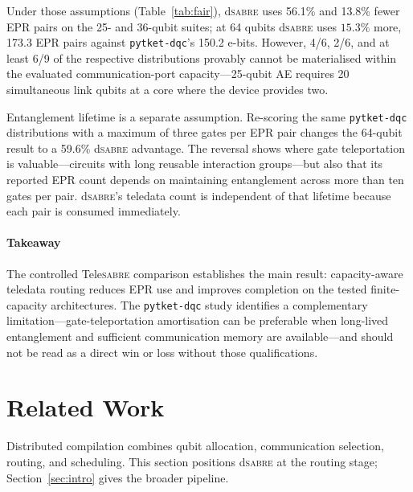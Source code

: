 \documentclass[journal]{IEEEtran}
\newcommand{\dSABRE}{d\textsc{sabre}}
\newcommand{\TeleSABRE}{Tele\textsc{sabre}}
\begin{document}
\label{sec:pytket_results}Under those assumptions (Table~\ref{tab:fair}), \dSABRE{} uses 56.1\% and 13.8\% fewer EPR pairs on the 25- and 36-qubit suites; at 64 qubits \dSABRE{} uses $15.3\%$ more, 173.3 EPR pairs against \texttt{pytket-dqc}'s 150.2 e-bits.  However, 4/6, 2/6, and at least 6/9 of the respective distributions provably cannot be materialised within the evaluated communication-port capacity---25-qubit AE requires 20 simultaneous link qubits at a core where the device provides two.

\label{sec:lifetime}Entanglement lifetime is a separate assumption.  Re-scoring the same \texttt{pytket-dqc} distributions with a maximum of three gates per EPR pair changes the 64-qubit result to a 59.6\% \dSABRE{} advantage.  The reversal shows where gate teleportation is valuable---circuits with long reusable interaction groups---but also that its reported EPR count depends on maintaining entanglement across more than ten gates per pair.  \dSABRE{}'s teledata count is independent of that lifetime because each pair is consumed immediately.

\paragraph*{Takeaway} The controlled \TeleSABRE{} comparison establishes the main result: capacity-aware teledata routing reduces EPR use and improves completion on the tested finite-capacity architectures.  The \texttt{pytket-dqc} study identifies a complementary limitation---gate-teleportation amortisation can be preferable when long-lived entanglement and sufficient communication memory are available---and should not be read as a direct win or loss without those qualifications.

\section{Related Work}
\label{sec:related}

Distributed compilation combines qubit allocation, communication selection,
routing, and scheduling. This section positions \dSABRE{} at the routing
stage; Section~\ref{sec:intro} gives the broader pipeline.
\end{document}
